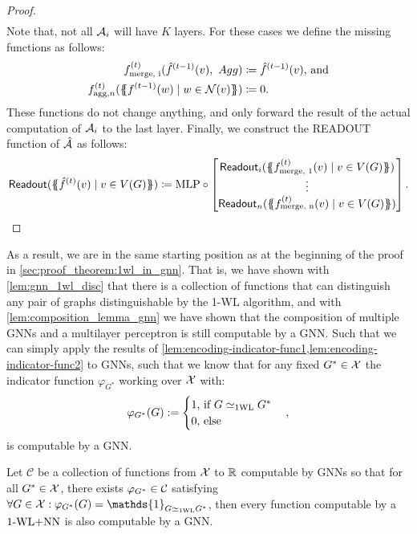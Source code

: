 \begin{proof}
\begin{align*}
    \end{align*}
    Note that, not all $\mathcal{A}_i$ will have $K$ layers. For these cases we define the missing functions as follows:
    \begin{align*}
        f^{(t)}_{\text{merge, i}}(\hat{f}^{(t-1)}(v), \ Agg) &\coloneqq \hat{f}^{(t-1)}(v)\text{, and}\\
        f^{(t)}_{\text{agg}, n}(\{\!\!\{ f^{(t-1)}(w) \mid w \in \mathcal{N}(v) \}\!\!\}) &\coloneqq 0.
    \end{align*}
    These functions do not change anything, and only forward the result of the actual computation of $\mathcal{A}_i$ to the last layer. Finally, we construct the \textsf{READOUT} function of $\hat{\mathcal{A}}$ as follows:
    \begin{align*}
        \textsf{Readout}(\MSopen \hat{f}^{(t)}(v) \mid v \in V(G) \MSclose) \coloneqq \mlp \circ \begin{bmatrix}
            \textsf{Readout}_i(\MSopen f^{(t)}_{\text{merge, 1}}(v) \mid v \in V(G) \MSclose)\\
            \vdots\\
            \textsf{Readout}_n(\MSopen f^{(t)}_{\text{merge, n}}(v) \mid v \in V(G) \MSclose)
        \end{bmatrix}.
    \end{align*}
\end{proof}

As a result, we are in the same starting position as at the beginning of the proof in \autoref{sec:proof_theorem:1wl_in_gnn}. That is, we have shown with \cref{lem:gnn_1wl_disc} that there is a collection of functions that can distinguish any pair of graphs distinguishable by the 1-WL algorithm, and with \cref{lem:composition_lemma_gnn} we have shown that the composition of multiple GNNs and a multilayer perceptron is still computable by a GNN. Such that we can simply apply the results of \cref{lem:encoding-indicator-func1,lem:encoding-indicator-func2} to GNNs, such that we know that for any fixed $G^* \in \mathcal{X}$ the indicator function $\varphi_{G^*}$ working over $\mathcal{X}$ with:
\begin{align*}
    \varphi_{G^*}(G) := \begin{cases}
    1\text{, if $G \simeq_{\text{1WL}} G^*$}\\
    0\text{, else}
\end{cases},
\end{align*}
is computable by a GNN.

\begin{lemma}\label{lem:decompose_gnn_as_wl}
    Let $\mathcal{C}$ be a collection of functions from $\mathcal{X}$ to $\mathbb{R}$ computable by GNNs so that for all $G^* \in \mathcal{X}$, there exists 
    $\varphi_{G^*} \in \mathcal{C}$ satisfying $\forall G \in \cX: \varphi_{G^*}(G) = \mathds{1}_{G \wliso G^*}$, then every function computable by a $\text{1-WL+NN}$ is also computable by a GNN.
\end{lemma}


